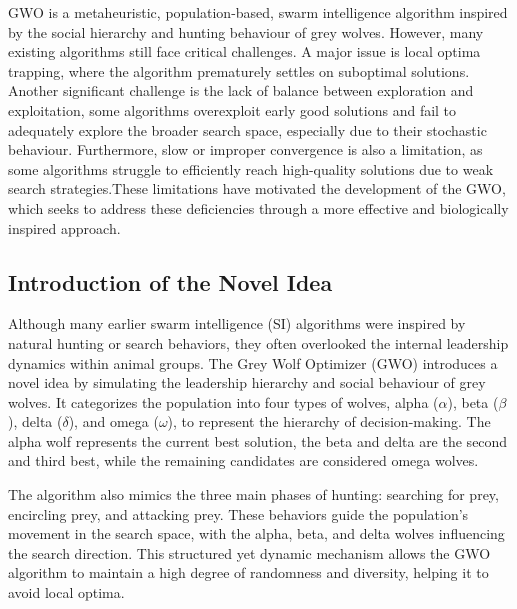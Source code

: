 \documentclass[a4paper, 12pt]{extarticle}
\begin{document}
GWO is a metaheuristic, population-based, swarm intelligence algorithm inspired by the social hierarchy and hunting behaviour of grey wolves. However, many existing algorithms still face critical challenges. A major issue is local optima trapping, where the algorithm prematurely settles on suboptimal solutions. Another significant challenge is the lack of balance between exploration and exploitation, some algorithms overexploit early good solutions and fail to adequately explore the broader search space, especially due to their stochastic behaviour. Furthermore, slow or improper convergence is also a limitation, as some algorithms struggle to efficiently reach high-quality solutions due to weak search strategies.These limitations have motivated the development of the GWO, which seeks to address these deficiencies through a more effective and biologically inspired approach. 

\subsection{Introduction of the Novel Idea}
Although many earlier swarm intelligence (SI) algorithms were inspired by natural hunting or search behaviors, they often overlooked the internal leadership dynamics within animal groups. The Grey Wolf Optimizer (GWO) introduces a novel idea by simulating the leadership hierarchy and social behaviour of grey wolves. It categorizes the population into four types of wolves, alpha ($\alpha$), beta ($\beta$), delta ($\delta$), and omega ($\omega$), to represent the hierarchy of decision-making. The alpha wolf represents the current best solution, the beta and delta are the second and third best, while the remaining candidates are considered omega wolves.

The algorithm also mimics the three main phases of hunting: searching for prey, encircling prey, and attacking prey. These behaviors guide the population’s movement in the search space, with the alpha, beta, and delta wolves influencing the search direction. This structured yet dynamic mechanism allows the GWO algorithm to maintain a high degree of randomness and diversity, helping it to avoid local optima. \cite{kandasamy2020literature}
\end{document}
